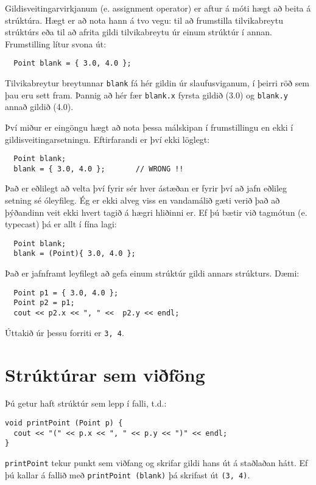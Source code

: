 Gildisveitingarvirkjanum (e. assignment operator) er aftur á móti hægt að beita á strúktúra.
Hægt er að nota hann á tvo vegu: til að frumstilla tilvikabreytu strúktúrs eða til að afrita gildi tilvikabreytu úr einum strúktúr í annan.
Frumstilling lítur svona út:

\begin{verbatim}
  Point blank = { 3.0, 4.0 };
\end{verbatim}
%
Tilvikabreytur breytunnar {\tt blank} fá hér gildin úr slaufusviganum, í þeirri röð sem þau eru sett fram.
Þannig að hér fær {\tt blank.x} fyrsta gildið (3.0) og {\tt blank.y} annað gildið (4.0). 

Því miður er eingöngu hægt að nota þessa málskipan í frumstillingu en ekki í gildisveitingarsetningu.
Eftirfarandi er því ekki löglegt:

\begin{verbatim}
  Point blank;
  blank = { 3.0, 4.0 };       // WRONG !!
\end{verbatim}
%
Það er eðlilegt að velta því fyrir sér hver ástæðan er fyrir því að jafn eðlileg setning sé óleyfileg.
Ég er ekki alveg viss en vandamálið gæti verið það að þýðandinn veit ekki hvert tagið á hægri hliðinni er.
Ef þú bætir við tagmótun (e. typecast) þá er allt í fína lagi:

\begin{verbatim}
  Point blank;
  blank = (Point){ 3.0, 4.0 };
\end{verbatim}
%

Það er jafnframt leyfilegt að gefa einum strúktúr gildi annars strúkturs. Dæmi: 

\begin{verbatim}
  Point p1 = { 3.0, 4.0 };
  Point p2 = p1;
  cout << p2.x << ", " <<  p2.y << endl;
\end{verbatim}
%
Úttakið úr þessu forriti er {\tt 3, 4}.

\section{Strúktúrar sem viðföng}

Þú getur haft strúktúr sem lepp í falli, t.d.:

\begin{verbatim}
void printPoint (Point p) {
  cout << "(" << p.x << ", " << p.y << ")" << endl;
}
\end{verbatim}
%
{\tt printPoint} tekur punkt sem viðfang og skrifar gildi hans út á staðlaðan hátt.
Ef þú kallar á fallið með {\tt printPoint (blank)} þá skrifast út {\tt (3, 4)}.

